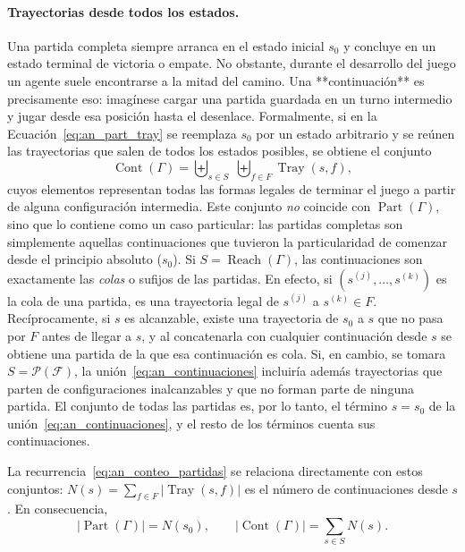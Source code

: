 \paragraph{Trayectorias desde todos los estados.} Una partida completa siempre arranca en el estado inicial $s_0$ y concluye en un estado terminal de victoria o empate. No obstante, durante el desarrollo del juego un agente suele encontrarse a la mitad del camino. Una **continuación** es precisamente eso: imagínese cargar una partida guardada en un turno intermedio y jugar desde esa posición hasta el desenlace. Formalmente, si en la Ecuación~\eqref{eq:an_part_tray} se reemplaza $s_0$ por un estado arbitrario y se reúnen las trayectorias que salen de todos los estados posibles, se obtiene el conjunto
\begin{equation}
    \operatorname{Cont}(\Gamma) = \biguplus_{s \in S} \; \biguplus_{f \in F} \operatorname{Tray}(s, f),
    \label{eq:an_continuaciones}
\end{equation}
cuyos elementos representan todas las formas legales de terminar el juego a partir de alguna configuración intermedia. Este conjunto \emph{no} coincide con $\operatorname{Part}(\Gamma)$, sino que lo contiene como un caso particular: las partidas completas son simplemente aquellas continuaciones que tuvieron la particularidad de comenzar desde el principio absoluto ($s_0$). Si $S = \operatorname{Reach}(\Gamma)$, las continuaciones son exactamente las \emph{colas} o sufijos de las partidas. En efecto, si $(s^{(j)}, \dots, s^{(k)})$ es la cola de una partida, es una trayectoria legal de $s^{(j)}$ a $s^{(k)} \in F$. Recíprocamente, si $s$ es alcanzable, existe una trayectoria de $s_0$ a $s$ que no pasa por $F$ antes de llegar a $s$, y al concatenarla con cualquier continuación desde $s$ se obtiene una partida de la que esa continuación es cola. Si, en cambio, se tomara $S = \mathcal P(\mathcal F)$, la unión~\eqref{eq:an_continuaciones} incluiría además trayectorias que parten de configuraciones inalcanzables y que no forman parte de ninguna partida. El conjunto de todas las partidas es, por lo tanto, el término $s = s_0$ de la unión~\eqref{eq:an_continuaciones}, y el resto de los términos cuenta sus continuaciones.

La recurrencia~\eqref{eq:an_conteo_partidas} se relaciona directamente con estos conjuntos: $N(s) = \sum_{f \in F} |\operatorname{Tray}(s, f)|$ es el número de continuaciones desde $s$. En consecuencia,
\begin{equation}
    |\operatorname{Part}(\Gamma)| = N(s_0),
    \qquad
    |\operatorname{Cont}(\Gamma)| = \sum_{s \in S} N(s).
    \label{eq:an_part_cont}
\end{equation}

